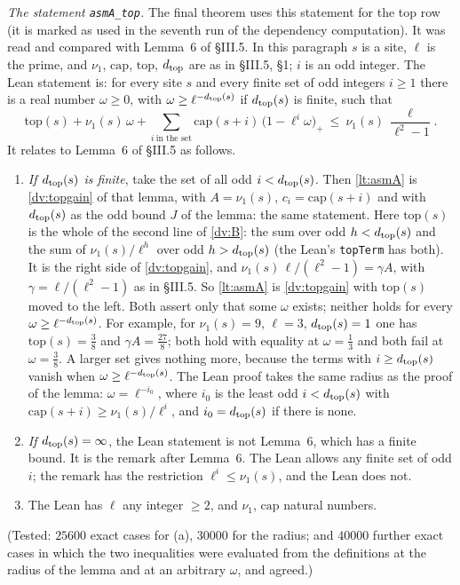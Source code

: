 \documentclass[11pt,letterpaper]{article}
\begin{document}
\emph{The statement \texttt{asmA\_top}.} The final theorem uses this statement for the top row (it is
marked as used in the seventh run of the dependency computation). It was read and compared with Lemma~6 of \S III.5. In this paragraph $s$ is a site, $\ell$ is the prime, and
$\nu_1$, $\mathrm{cap}$, $\mathrm{top}$, $d_{\rm top}$ are as in \S III.5, \S1; $i$ is an odd integer. The
Lean statement is: for every site $s$ and every finite set of odd integers $i\ge1$ there is a real number
$\omega\ge0$, with $\omega\ge\ell^{-d_{\rm top}(s)}$ if $d_{\rm top}(s)$ is finite, such that
\begin{equation}\label{lt:asmA}
 \mathrm{top}(s)+\nu_1(s)\,\omega+\sum_{i\ \text{in the set}}\mathrm{cap}(s+i)\,\big(1-\ell^i\omega\big)_+
 \ \le\ \nu_1(s)\,\frac{\ell}{\ell^2-1}.
\end{equation}
It relates to Lemma~6 of \S III.5 as follows.
\begin{enumerate}[label=\textup{(\alph*)},leftmargin=2.4em,itemsep=1pt,topsep=2pt]
\item \emph{If $d_{\rm top}(s)$ is finite}, take the set of all odd $i<d_{\rm top}(s)$. Then \eqref{lt:asmA}
is \eqref{dv:topgain} of that lemma, with $A=\nu_1(s)$, $c_i=\mathrm{cap}(s+i)$ and with $d_{\rm top}(s)$ as the
odd bound $J$ of the lemma: the same statement. Here $\mathrm{top}(s)$ is the whole of the second line of
\eqref{dv:B}: the sum over odd $h<d_{\rm top}(s)$ and the sum of $\nu_1(s)/\ell^h$ over odd
$h>d_{\rm top}(s)$ (the Lean's \texttt{topTerm} has both). It is the right side of \eqref{dv:topgain}, and
$\nu_1(s)\,\ell/(\ell^2-1)=\gamma A$, with $\gamma=\ell/(\ell^2-1)$ as in \S III.5. So \eqref{lt:asmA} is \eqref{dv:topgain} with $\mathrm{top}(s)$ moved
to the left. Both assert only that some $\omega$ exists; neither holds for every $\omega\ge\ell^{-d_{\rm top}(s)}$.
For example, for $\nu_1(s)=9$, $\ell=3$, $d_{\rm top}(s)=1$ one has $\mathrm{top}(s)=\frac38$ and
$\gamma A=\frac{27}8$; both hold with equality at $\omega=\frac13$ and both fail at $\omega=\frac38$. A larger set gives nothing more, because the terms with $i\ge d_{\rm top}(s)$ vanish when
$\omega\ge\ell^{-d_{\rm top}(s)}$. The Lean proof takes the same radius as the proof of the lemma:
$\omega=\ell^{-i_0}$, where $i_0$ is the least odd $i<d_{\rm top}(s)$ with
$\mathrm{cap}(s+i)\ge\nu_1(s)/\ell^i$, and $i_0=d_{\rm top}(s)$ if there is none.
\item \emph{If $d_{\rm top}(s)=\infty$}, the Lean statement is not Lemma~6, which has a finite bound. It is
the remark after Lemma~6. The Lean allows any finite set of odd $i$; the remark has the restriction
$\ell^i\le\nu_1(s)$, and the Lean does not.
\item The Lean has $\ell$ any integer $\ge2$, and $\nu_1$, $\mathrm{cap}$ natural numbers.
\end{enumerate}
(Tested: $25600$ exact cases for (a), $30000$ for the radius; and $40000$ further exact cases in which the two inequalities were evaluated from the definitions at the radius of the lemma and at an arbitrary $\omega$, and agreed.)
\end{document}
